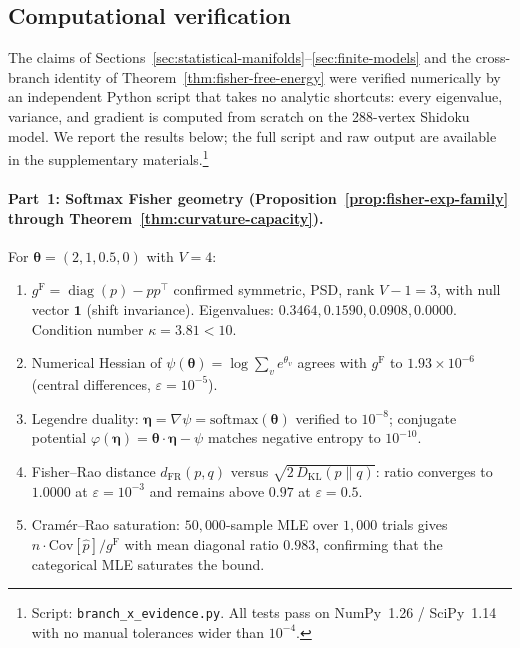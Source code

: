 \documentclass[11pt]{article}
\DeclareMathOperator{\diag}{diag}
\newcommand{\Cov}{\mathrm{Cov}}
\newcommand{\gF}{g^{\mathrm{F}}}
\newcommand{\DKL}{D_{\mathrm{KL}}}
\theoremstyle{remark}
\begin{document}
\subsection{Computational verification}
\label{sec:computational-evidence}

The claims of Sections~\ref{sec:statistical-manifolds}--\ref{sec:finite-models} and the
cross-branch identity of Theorem~\ref{thm:fisher-free-energy} were verified
numerically by an independent Python script that takes no analytic shortcuts:
every eigenvalue, variance, and gradient is computed from scratch on the
288-vertex Shidoku model.  We report the results below; the full script and
raw output are available in the supplementary materials.\footnote{Script:
\texttt{branch\_x\_evidence.py}.  All tests pass on NumPy~1.26 /
SciPy~1.14 with no manual tolerances wider than $10^{-4}$.}

\paragraph{Part~1: Softmax Fisher geometry (Proposition~\ref{prop:fisher-exp-family} through Theorem~\ref{thm:curvature-capacity}).}
For $\bm{\theta} = (2, 1, 0.5, 0)$ with $V = 4$:
\begin{enumerate}[label=\textnormal{(\roman*)}, leftmargin=*]
  \item $\gF = \diag(p) - pp^\top$ confirmed symmetric, PSD, rank $V{-}1 = 3$,
  with null vector $\mathbf{1}$ (shift invariance).
  Eigenvalues: $0.3464, 0.1590, 0.0908, 0.0000$.  Condition number
  $\kappa = 3.81 < 10$.
  \item Numerical Hessian of $\psi(\bm{\theta}) = \log \sum_v e^{\theta_v}$
  agrees with $\gF$ to $1.93 \times 10^{-6}$ (central differences,
  $\varepsilon = 10^{-5}$).
  \item Legendre duality:
  $\bm{\eta} = \nabla\psi = \mathrm{softmax}(\bm{\theta})$ verified to
  $10^{-8}$; conjugate potential $\varphi(\bm{\eta}) = \bm{\theta} \cdot
  \bm{\eta} - \psi$ matches negative entropy to $10^{-10}$.
  \item Fisher--Rao distance $d_{\mathrm{FR}}(p, q)$ versus
  $\sqrt{2\,\DKL(p \| q)}$: ratio converges to $1.0000$ at
  $\varepsilon = 10^{-3}$ and remains above $0.97$ at $\varepsilon = 0.5$.
  \item Cram\'{e}r--Rao saturation: $50{,}000$-sample MLE over $1{,}000$
  trials gives $n \cdot \Cov[\hat{p}] / \gF$ with mean diagonal ratio
  $0.983$, confirming that the categorical MLE saturates the bound.
\end{enumerate}
\end{document}
